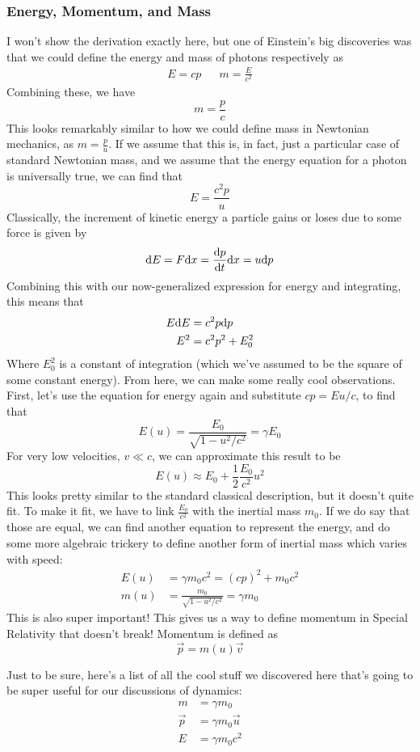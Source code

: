 \documentclass[a4paper]{article}
\begin{document}
\subsubsection{Energy, Momentum, and Mass}
I won't show the derivation exactly here, but one of Einstein's big discoveries
was that we could define the energy and mass of photons respectively as
\begin{align*}
	E = cp && m = \frac{E}{c^2}
\end{align*}
Combining these, we have
\[ m = \frac{p}{c} \]
This looks remarkably similar to how we could define mass in Newtonian
mechanics, as $m = \frac{p}{u}$. If we assume that this is, in fact, just
a particular case of standard Newtonian mass, and we assume that the energy
equation for a photon is universally true, we can find that
\[ E = \frac{c^2p}{u} \]
Classically, the increment of kinetic energy a particle gains or loses
due to some force is given by
\[ \mathrm{d} E = F\mathrm{d} x = \frac{\mathrm{d} p}{\mathrm{d} t}\mathrm{d} x = u\mathrm{d} p \]
Combining this with our now-generalized expression for energy and integrating,
this means that
\begin{align*}
	E\mathrm{d} E &= c^2p\mathrm{d} p\\
	E^2 &= c^2p^2 + E_0^2
\end{align*}
Where $E_0^2$ is a constant of integration (which we've assumed to be the
square of some constant energy). From here, we can make some really cool
observations. First, let's use the equation for energy again and substitute
$cp = Eu/c$, to find that
\[ E(u) = \frac{E_0}{\sqrt{1-u^2/c^2}} = \gamma E_0 \]
For very low velocities, $v \ll c$, we can approximate this result to be
\[ E(u) \approx E_0 + \frac{1}{2}\frac{E_0}{c^2}u^2 \]
This looks pretty similar to the standard classical description, but it doesn't
quite fit. To make it fit, we have to link $\frac{E_0}{c^2}$ with the inertial
mass $m_0$. If we do say that those are equal, we can find another
equation to represent the energy, and do some more
algebraic trickery to define another form of inertial mass which varies
with speed:
\begin{align*}
	E(u) &= \gamma m_0 c^2 = (cp)^2 + m_0c^2\\
	m(u) &= \frac{m_0}{\sqrt{1-u^2/c^2}} = \gamma m_0
\end{align*}
This is also super important! This gives us a way to define momentum in
Special Relativity that doesn't break! Momentum is defined as
\[ \vec{p} = m(u)\vec{v} \]

Just to be sure, here's a list of all the cool stuff we discovered here that's
going to be super useful for our discussions of dynamics:
\begin{align*}
	m &= \gamma m_0\\
	\vec{p} &= \gamma m_0 \vec{u}\\
	E &= \gamma m_0 c^2
\end{align*}
\end{document}
